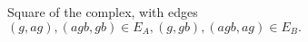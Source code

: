 \documentclass{article}
\begin{document}
\begin{figure}[H]
\begin{center}
\begin{tikzpicture}
            \end{tikzpicture}
            \end{center}
            \caption{Square of the complex, with edges $(g,ag), (agb, gb) \in E_A,
            (g,gb), (agb, ag) \in E_B.$ \label{fig:square}
            }
            \end{figure}
 
\end{document}
